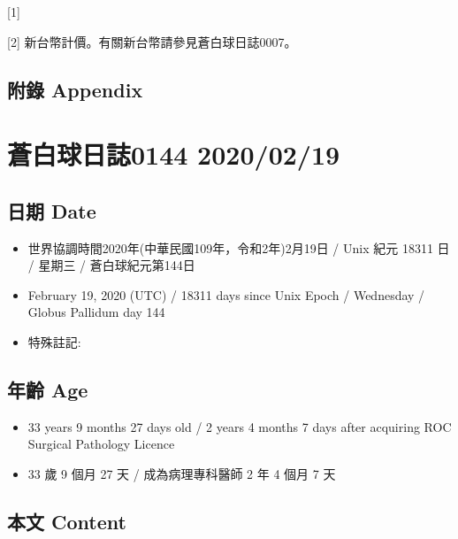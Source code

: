 \documentclass[a5paper, 12pt
]{book}
\providecommand{\tightlist}{%
  \setlength{\itemsep}{0pt}\setlength{\parskip}{0pt}}
\begin{document}
{[}1{]}

{[}2{]} 新台幣計價。有關新台幣請參見蒼白球日誌0007。

\hypertarget{ux9644ux9304-appendix-79}{%
\subsection{附錄 Appendix}\label{ux9644ux9304-appendix-79}}

\hypertarget{ux84bcux767dux7403ux65e5ux8a8c0144-20200219}{%
\section{蒼白球日誌0144
2020/02/19}\label{ux84bcux767dux7403ux65e5ux8a8c0144-20200219}}

\hypertarget{ux65e5ux671f-date-80}{%
\subsection{日期 Date}\label{ux65e5ux671f-date-80}}

\begin{itemize}
\tightlist
\item
  世界協調時間2020年(中華民國109年，令和2年)2月19日 / Unix 紀元 18311 日
  / 星期三 / 蒼白球紀元第144日
\item
  February 19, 2020 (UTC) / 18311 days since Unix Epoch / Wednesday /
  Globus Pallidum day 144
\item
  特殊註記:
\end{itemize}

\hypertarget{ux5e74ux9f61-age-80}{%
\subsection{年齡 Age}\label{ux5e74ux9f61-age-80}}

\begin{itemize}
\tightlist
\item
  33 years 9 months 27 days old / 2 years 4 months 7 days after
  acquiring ROC Surgical Pathology Licence
\item
  33 歲 9 個月 27 天 / 成為病理專科醫師 2 年 4 個月 7 天
\end{itemize}

\hypertarget{ux672cux6587-content-80}{%
\subsection{本文 Content}\label{ux672cux6587-content-80}}
\end{document}
